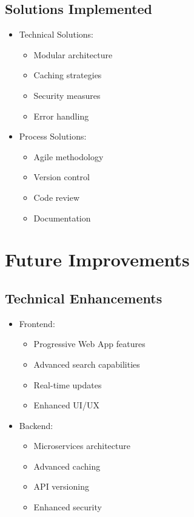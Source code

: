 \subsection{Solutions Implemented}
\begin{itemize}
    \item Technical Solutions:
    \begin{itemize}
        \item Modular architecture
        \item Caching strategies
        \item Security measures
        \item Error handling
    \end{itemize}
    \item Process Solutions:
    \begin{itemize}
        \item Agile methodology
        \item Version control
        \item Code review
        \item Documentation
    \end{itemize}
\end{itemize}

\section{Future Improvements}
\subsection{Technical Enhancements}
\begin{itemize}
    \item Frontend:
    \begin{itemize}
        \item Progressive Web App features
        \item Advanced search capabilities
        \item Real-time updates
        \item Enhanced UI/UX
    \end{itemize}
    \item Backend:
    \begin{itemize}
        \item Microservices architecture
        \item Advanced caching
        \item API versioning
        \item Enhanced security
    \end{itemize}
\end{itemize}

